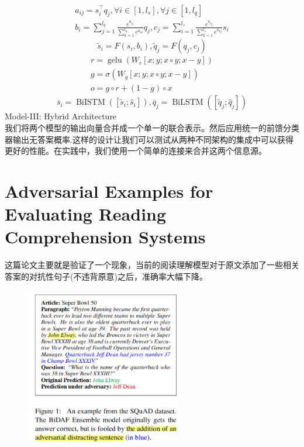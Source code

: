 \documentclass[a4paper,UTF8]{article}
\numberwithin{equation}{section}
\begin{document}
\begin{enumerate}
\begin{align*}
	\end{align*}
	\begin{equation}
	\begin{array}{c}{a_{i j}=s_{i}^{\top} q_{j}, \forall i \in\left[1, l_{s}\right], \forall j \in\left[1, l_{q}\right]} \\ {b_{i}=\sum_{j=1}^{l_{q}} \frac{e^{a_{i j}}}{\sum_{k=1}^{l_{q}} e^{a_{i k}}} q_{j}, c_{j}=\sum_{i=1}^{l_{s}} \frac{e^{a_{i j}}}{\sum_{k=1}^{l_{s}} e^{a_{k j}}} s_{i}}\end{array}
	\end{equation}
	\begin{equation}
		\tilde{s}_{i}=F\left(s_{i}, b_{i}\right), \tilde{q}_{j}=F\left(q_{j}, c_{j}\right)
		\end{equation}
		\begin{equation}
		\begin{array}{c}{r=\operatorname{gelu}\left(W_{r}[x ; y ; x \circ y ; x-y]\right)} \\ {g=\sigma\left(W_{g}[x ; y ; x \circ y ; x-y]\right)} \\ {o=g \circ r+(1-g) \circ x}\end{array}
		\end{equation}
		\begin{equation}
			\overline{s}_{i}=\operatorname{BiISTM}\left(\left[\tilde{s}_{i} ; \hat{s}_{i}\right]\right), \overline{q}_{j}=\operatorname{BiLSTM}\left(\left[\tilde{q}_{j} ; \hat{q}_{j}\right]\right)
			\end{equation}
	\subitem[3] Model-III: Hybrid Architecture\\
	我们将两个模型的输出向量合并成一个单一的联合表示。然后应用统一的前馈分类器输出无答案概率.这样的设计让我们可以测试从两种不同架构的集成中可以获得更好的性能。在实践中，我们使用一个简单的连接来合并这两个信息源。

\end{enumerate}


\newpage
\section{Adversarial Examples for Evaluating Reading Comprehension Systems}
这篇论文主要就是验证了一个现象，当前的阅读理解模型对于原文添加了一些相关答案的对抗性句子(不违背原意)之后，准确率大幅下降。
\begin{figure}[H]
	\centering
	\includegraphics[width=0.6\textwidth]{7-1.png}
\end{figure}
\newpage
\end{document}
